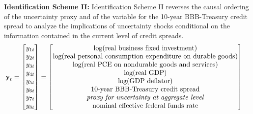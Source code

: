 \documentclass[a4paper,11pt,listof=nochaptergap,oneside,pointednumbers,bibtotoc,bigheadings,liststotoc,hidelinks]{scrbook}
\theoremstyle{mysatz}
\theoremstyle{mydefinition}
\theoremstyle{mytheorem}
\theoremstyle{mybemerkung}
\newcommand{\vect}[1]{\boldsymbol{\mathbf{#1}}}
\begin{document}
\textbf{Identification Scheme II:}      
Identification Scheme II reverses the causal ordering of the uncertainty proxy and of the variable for the 10-year BBB-Treasury credit spread to analyze the implications of uncertainty shocks conditional on the information contained in the current level of credit spreads.
\begin{equation} \label{eq:VAR21}
\begin{split}
\vect{y}_t & = 
 \begin{bmatrix} 
 		y_{1t} \\
		y_{2t} \\
		y_{3t} \\
		y_{4t} \\
		y_{5t} \\
		y_{6t} \\
		y_{7t} \\
		y_{8t} 
	      \end{bmatrix} = 	      
	      \begin{bmatrix} \text{log(real business fixed investment)} \\ 
				      \text{log(real personal consumption expenditure on durable goods)}\\ 
				      \text{log(real PCE on nondurable goods and services)}\\
				      \text{log(real GDP)}\\ 
				      \text{log(GDP deflator)}\\
				      \text{10-year BBB-Treasury credit spread}\\
				      \text{\textit{proxy for uncertainty at aggregate level}} \\
				      \text{nominal effective federal funds rate}
	      \end{bmatrix}
\end{split}
\end{equation}
\end{document}
